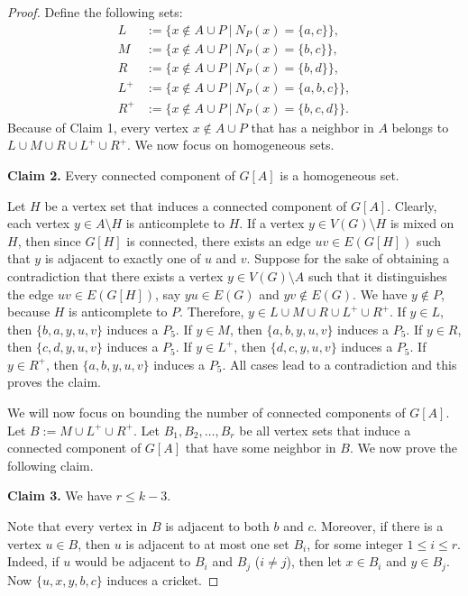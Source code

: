 \documentclass[10pt]{article}
\theoremstyle{definition}
\begin{document}
\begin{proof}
\bigskip

\noindent

Define the following sets:
\begin{align*}
L &:= \{x \notin A \cup P~|~N_P(x)=\{a,c\}\},\\
M &:= \{x \notin A \cup P~|~N_P(x)=\{b,c\}\},\\
R &:= \{x \notin A \cup P~|~N_P(x)=\{b,d\}\},\\
L^+ &:= \{x \notin A \cup P~|~N_P(x)=\{a,b,c\}\},\\
R^+ &:= \{x \notin A \cup P~|~N_P(x)=\{b,c,d\}\}.
\end{align*}
Because of Claim 1, every vertex $x \notin A \cup P$ that has a neighbor in $A$ belongs to $L\cup M\cup R\cup L^+\cup R^+$. We now focus on homogeneous sets.

\noindent \textbf{Claim 2.} Every connected component of $G[A]$ is a homogeneous set.

\bigskip

Let $H$ be a vertex set that induces a connected component of $G[A]$. Clearly, each vertex $y \in A \setminus H$ is anticomplete to $H$. If a vertex $y\in V(G)\setminus H$ is mixed on $H$, then since $G[H]$
is connected, there exists an edge $uv\in E(G[H])$ such that $y$ is adjacent
to exactly one of $u$ and $v$. Suppose for the sake of obtaining a contradiction that there exists a vertex $y \in V(G) \setminus A$ such that it distinguishes the edge $uv \in E(G[H])$, say $yu \in E(G)$ and $yv \notin E(G)$. We have $y \notin P$, because $H$ is anticomplete to $P$. Therefore, $y \in L\cup M\cup R\cup L^+\cup R^+$. If $y \in L$, then $\{b,a,y,u,v\}$ induces a $P_5$. If $y \in M$, then $\{a,b,y,u,v\}$ induces a $P_5$. If $y \in R$, then $\{c,d,y,u,v\}$ induces a $P_5$. If $y \in L^+$, then $\{d,c,y,u,v\}$ induces a $P_5$. If $y \in R^+$, then $\{a,b,y,u,v\}$ induces a $P_5$. All cases lead to a contradiction and this proves the claim.

\bigskip

\noindent

We will now focus on bounding the number of connected components of $G[A]$. Let $B := M\cup L^+\cup R^+$. Let $B_1, B_2, \ldots, B_r$ be all vertex sets that induce a connected component of $G[A]$ that have some neighbor in $B$. We now prove the following claim.


\noindent \textbf{Claim 3.} We have $r \leq k-3$.

\bigskip

Note that every vertex in $B$ is adjacent to both $b$ and $c$. Moreover, if there is a vertex $u \in B$, then $u$ is adjacent to at most one set $B_i$, for some integer $1 \leq i \leq r$. Indeed, if $u$ would be adjacent to $B_i$ and $B_j$ ($i \neq j$), then let $x \in B_i$ and $y \in B_j$. Now $\{u,x,y,b,c\}$ induces a cricket.


\end{proof}
\end{document}
